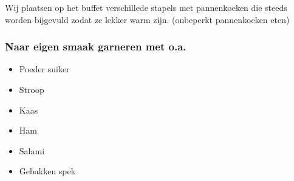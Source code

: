 Wij plaatsen op het buffet verschillede stapels met  pannenkoeken die steeds worden bijgevuld zodat ze lekker warm zijn. (onbeperkt pannenkoeken eten) 

\subsubsection{Naar eigen smaak garneren met o.a.}
\begin{itemize}
	\item	 Poeder suiker
	\item	 Stroop
	\item	 Kaas
	\item	 Ham
	\item	 Salami
	\item	 Gebakken spek
\end{itemize}